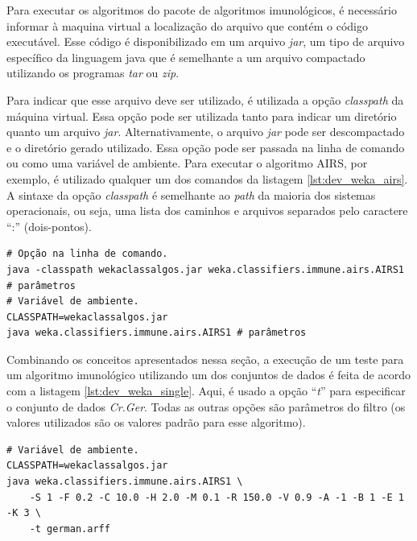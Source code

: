 Para executar os algoritmos do pacote de algoritmos imunológicos, é necessário informar à maquina virtual a localização do arquivo que contém o código executável. Esse código é disponibilizado em um arquivo \emph{jar}, um tipo de arquivo específico da linguagem java que é semelhante a um arquivo compactado utilizando os programas \emph{tar} ou \emph{zip}.

Para indicar que esse arquivo deve ser utilizado, é utilizada a opção \emph{classpath} da máquina virtual. Essa opção pode ser utilizada tanto para indicar um diretório quanto um arquivo \emph{jar}. Alternativamente, o arquivo \emph{jar} pode ser descompactado e o diretório gerado utilizado. Essa opção pode ser passada na linha de comando ou como uma variável de ambiente. Para executar o algoritmo AIRS, por exemplo, é utilizado qualquer um dos comandos da listagem \ref{lst:dev_weka_airs}. A sintaxe da opção \emph{classpath} é semelhante ao \emph{path} da maioria dos sistemas operacionais, ou seja, uma lista dos caminhos e arquivos separados pelo caractere ``:'' (dois-pontos).

\vspace{0.5cm}
\begin{lstlisting}[caption=Execução de um algoritmo do pacote de algoritmos imunológicos, label=lst:dev_weka_airs]
# Opção na linha de comando.
java -classpath wekaclassalgos.jar weka.classifiers.immune.airs.AIRS1 # parâmetros
# Variável de ambiente.
CLASSPATH=wekaclassalgos.jar
java weka.classifiers.immune.airs.AIRS1 # parâmetros
\end{lstlisting}
\vspace{0.5cm}

Combinando os conceitos apresentados nessa seção, a execução de um teste para um algoritmo imunológico utilizando um dos conjuntos de dados é feita de acordo com a listagem \ref{lst:dev_weka_single}. Aqui, é usado a opção ``\emph{t}'' para especificar o conjunto de dados \emph{Cr.Ger}. Todas as outras opções são parâmetros do filtro (os valores utilizados são os valores padrão para esse algoritmo).

\vspace{0.5cm}
\begin{lstlisting}[caption=Execução de um algoritmo do pacote de algoritmos imunológicos utilizando um dos conjuntos de dados, label=lst:dev_weka_single]
# Variável de ambiente.
CLASSPATH=wekaclassalgos.jar
java weka.classifiers.immune.airs.AIRS1 \
    -S 1 -F 0.2 -C 10.0 -H 2.0 -M 0.1 -R 150.0 -V 0.9 -A -1 -B 1 -E 1 -K 3 \
    -t german.arff
\end{lstlisting}
\vspace{0.5cm}
